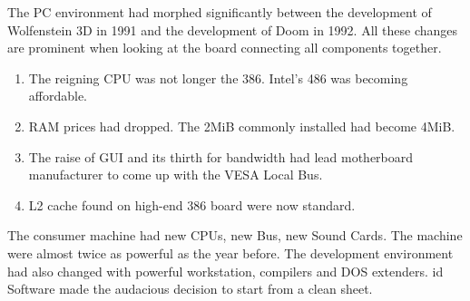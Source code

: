The PC environment had morphed significantly between the development of Wolfenstein 3D in 1991 and the development of Doom in 1992. All these changes are prominent when looking at the board connecting all components together.\\
\par
{}
\par
\begin{enumerate}
\item The reigning CPU was not longer the 386. Intel's 486 was becoming affordable.
\item RAM prices had dropped. The 2MiB commonly installed had become 4MiB. 
\item The raise of GUI and its thirth for bandwidth had lead motherboard manufacturer to come up with the VESA Local Bus.
\item L2 cache found on high-end 386 board were now standard.
\end{enumerate}

The consumer machine had new CPUs, new Bus, new Sound Cards. The machine were almost twice as powerful as the year before. The development environment had also changed with powerful workstation, compilers and DOS extenders. id Software made the audacious decision to start from a clean sheet.\\

\par
{}




